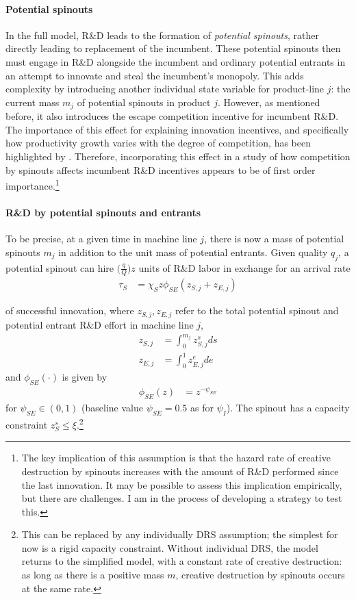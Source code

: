 \documentclass[12pt,english]{article}
\theoremstyle{remark}
\begin{document}
\paragraph{Potential spinouts}

In the full model, R\&D leads to the formation of \textit{potential spinouts}, rather directly leading to replacement of the incumbent. These potential spinouts then must engage in R\&D alongside the incumbent and ordinary potential entrants in an attempt to innovate and steal the incumbent's monopoly. This adds complexity by introducing another individual state variable for product-line $j$: the current mass $m_j$ of potential spinouts in product $j$. However, as mentioned before, it also introduces the escape competition incentive for incumbent R\&D. The importance of this effect for explaining innovation incentives, and specifically how productivity growth varies with the degree of competition, has been highlighted by \cite{aghion_competition_2005}. Therefore, incorporating this effect in a study of how competition by spinouts affects incumbent R\&D incentives appears to be of first order importance.\footnote{The key implication of this assumption is that the hazard rate of creative destruction by spinouts increases with the amount of R\&D performed since the last innovation. It may be possible to assess this implication empirically, but there are challenges. I am in the process of developing a strategy to test this.}

\paragraph{R\&D by potential spinouts and entrants}

To be precise, at a given time in machine line $j$, there is now a mass of potential spinouts $m_j$ in addition to the unit mass of potential entrants. Given quality $q_j$, a potential spinout can hire $\Big( \frac{q}{Q}\Big) z$ units of R\&D labor in exchange for an arrival rate
\begin{align}
	\tau_S &= \chi_S z \phi_{SE} (z_{S,j} + z_{E,j})  
\end{align}

of successful innovation, where $z_{S,j},z_{E,j}$ refer to the total potential spinout and potential entrant R\&D effort in machine line $j$,
\begin{align}
	z_{S,j} &= \int_0^{m_j} z_{S,j}^s ds \\
	z_{E,j} &= \int_0^1 z_{E,j}^e de
\end{align}
and $\phi_{SE}(\cdot) $ is given by 
\begin{align}
	\phi_{SE} (z) &= z^{-\psi_{SE}}
\end{align} 
for $\psi_{SE} \in (0,1)$ (baseline value $\psi_{SE} = 0.5$ as for $\psi_I$). The spinout has a capacity constraint $z_S^s \le \xi$.\footnote{This can be replaced by any individually DRS assumption; the simplest for now is a rigid capacity constraint. Without individual DRS, the model returns to the simplified model, with a constant rate of creative destruction: as long as there is a positive mass $m$, creative destruction by spinouts occurs at the same rate.}
\end{document}
